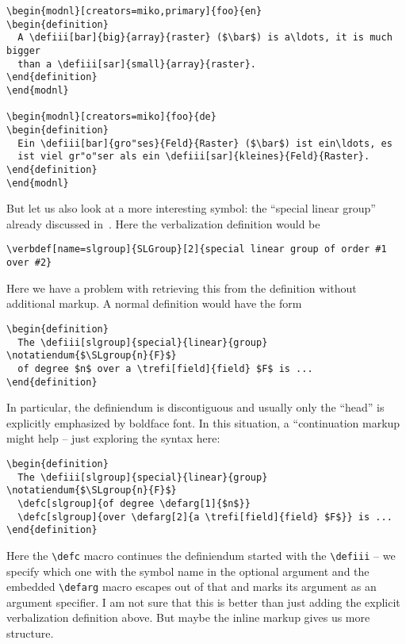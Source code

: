 \documentclass{bluenote}
\begin{document}
\begin{lstlisting}[label=lst:newmods,caption=Definiendum Markup in Language Bindings]
\begin{modnl}[creators=miko,primary]{foo}{en}
\begin{definition}
  A \defiii[bar]{big}{array}{raster} ($\bar$) is a\ldots, it is much bigger
  than a \defiii[sar]{small}{array}{raster}. 
\end{definition}
\end{modnl}

\begin{modnl}[creators=miko]{foo}{de}
\begin{definition}
  Ein \defiii[bar]{gro"ses}{Feld}{Raster} ($\bar$) ist ein\ldots, es
  ist viel gr"o"ser als ein \defiii[sar]{kleines}{Feld}{Raster}. 
\end{definition}
\end{modnl}
\end{lstlisting}

But let us also look at a more interesting symbol: the ``special linear group'' already
discussed in~\cite{Kohlhase:dmsmglom14}. Here the \sTeX verbalization definition would be 
\begin{lstlisting}
\verbdef[name=slgroup]{SLGroup}[2]{special linear group of order #1 over #2}
\end{lstlisting}
Here we have a problem with retrieving this from the definition without additional
markup. A normal definition would have the form
\begin{lstlisting}
\begin{definition}
  The \defiii[slgroup]{special}{linear}{group} \notatiendum{$\SLgroup{n}{F}$}
  of degree $n$ over a \trefi[field]{field} $F$ is ...
\end{definition}
\end{lstlisting}
In particular, the definiendum is discontiguous and usually only the ``head'' is
explicitly emphasized by boldface font. In this situation, a ``continuation markup might
help -- just exploring the syntax here:
\begin{lstlisting}
\begin{definition}
  The \defiii[slgroup]{special}{linear}{group} \notatiendum{$\SLgroup{n}{F}$}
  \defc[slgroup]{of degree \defarg[1]{$n$}} 
  \defc[slgroup]{over \defarg[2]{a \trefi[field]{field} $F$}} is ...
\end{definition}
\end{lstlisting}
Here the \lstinline|\defc| macro continues the definiendum started with the
\lstinline|\defiii| -- we specify which one with the symbol name in the optional argument
and the embedded \lstinline|\defarg| macro escapes out of that and marks its argument as
an argument specifier. I am not sure that this is better than just adding the explicit
verbalization definition above. But maybe the inline markup gives us more structure.
\end{document}
